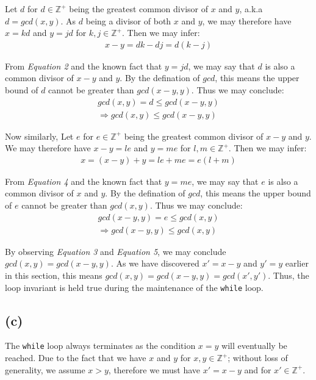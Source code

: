 \documentclass[12pt]{article}
\newcommand{\inlinecode}{\texttt}
\begin{document}
Let $d$ for $d \in \mathbb{Z^+}$ being the greatest common divisor of $x$ and $y$, a.k.a $d = gcd(x, y)$. As $d$ being a divisor of both $x$ and $y$, we may therefore have $x = kd$ and $y = jd$ for $k, j \in \mathbb{Z^+}$. Then we may infer:
\begin{gather}
    x - y = dk - dj = d(k - j)
\end{gather}

From \textit{Equation 2} and the known fact that $y = jd$, we may say that $d$ is also a common divisor of $x - y$ and $y$. By the defination of $gcd$, this means the upper bound of $d$ cannot be greater than $gcd(x-y, y)$. Thus we may conclude:
\begin{gather}
    gcd(x, y) = d \leq gcd(x-y, y) \nonumber \\
    \Rightarrow gcd(x, y) \leq gcd(x-y, y)
\end{gather}

Now similarly, Let $e$ for $e \in \mathbb{Z^+}$ being the greatest common divisor of $x-y$ and $y$. We may therefore have $x - y = le$ and $y = me$ for $l, m \in \mathbb{Z^+}$. Then we may infer:
\begin{gather}
    x = (x - y) + y = le + me = e(l + m)
\end{gather}

From \textit{Equation 4} and the known fact that $y = me$, we may say that $e$ is also a common divisor of $x$ and $y$. By the defination of $gcd$, this means the upper bound of $e$ cannot be greater than $gcd(x, y)$. Thus we may conclude:
\begin{gather}
    gcd(x-y, y) = e \leq gcd(x, y) \nonumber  \\
    \Rightarrow gcd(x-y, y) \leq gcd(x, y)
\end{gather}

By observing \textit{Equation 3} and \textit{Equation 5}, we may conclude $gcd(x, y) = gcd(x-y, y)$. As we have discovered $x' = x - y$ and $y' = y$ earlier in this section, this means $gcd(x, y) = gcd(x-y, y) = gcd(x', y')$. Thus, the loop invariant is held true during the maintenance of the \inlinecode{while} loop.

\subsection{(c)}

The \inlinecode{while} loop always terminates as the condition $x = y$ will eventually be reached. Due to the fact that we have $x$ and $y$ for $x, y \in \mathbb{Z^+}$; without loss of generality, we assume $x > y$, therefore we must have $x' = x - y$  and for $x' \in \mathbb{Z^+}$.
\end{document}
